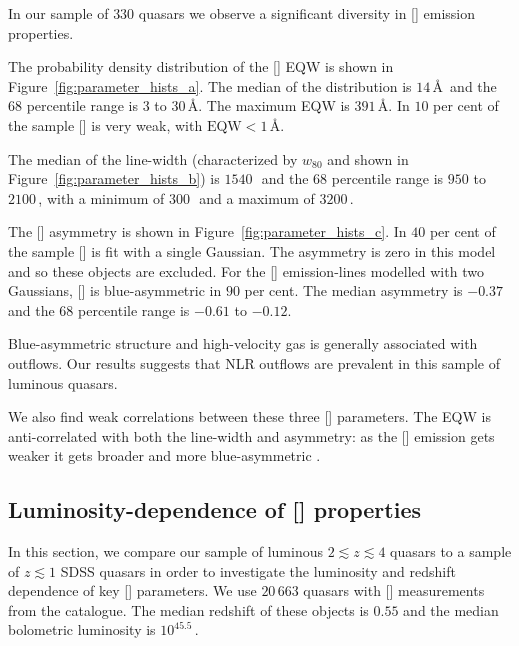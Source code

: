 In our sample of $330$ quasars we observe a significant diversity in [] emission properties.

The probability density distribution of the [] EQW is shown in Figure~\ref{fig:parameter_hists_a}.
The median of the distribution is $14$\,\AA\, and the $68$ percentile range is $3$ to $30$\,\AA.
The maximum EQW is $391$\,\AA.
In $10$ per cent of the sample [] is very weak, with $\text{EQW} < 1$\,\AA.

The median of the line-width (characterized by $w_{80}$ and shown in Figure~\ref{fig:parameter_hists_b}) is $1540$\,\kms\, and the $68$ percentile range is $950$ to $2100$\,\kms, with a minimum of $300$\,\kms\, and a maximum of $3200$\,\kms.

The [] asymmetry is shown in Figure~\ref{fig:parameter_hists_c}.
In $40$ per cent of the sample [] is fit with a single Gaussian.
The asymmetry is zero in this model and so these objects are excluded.
For the [] emission-lines modelled with two Gaussians, [] is blue-asymmetric in $90$ per cent.
The median asymmetry is $-0.37$ and the $68$ percentile range is $-0.61$ to $-0.12$.

Blue-asymmetric structure and high-velocity gas is generally associated with outflows.
Our results suggests that NLR outflows are prevalent in this sample of luminous quasars.

We also find weak correlations between these three [] parameters.
The EQW is anti-correlated with both the line-width and asymmetry: as the [] emission gets weaker it gets broader and more blue-asymmetric \citep[e.g.][]{shen14}.

\subsection{Luminosity-dependence of [] properties}
\label{sec:ch4-lumdependence}

In this section, we compare our sample of luminous $2 \lesssim z \lesssim 4$ quasars to a sample of $z\lesssim1$ SDSS quasars in order to investigate the luminosity and redshift dependence of key [] parameters.
We use $20\,663$ quasars with [] measurements from the \citet{shen11} catalogue.
The median redshift of these objects is $0.55$ and the median bolometric luminosity is $10^{45.5}$\,\ergs.

